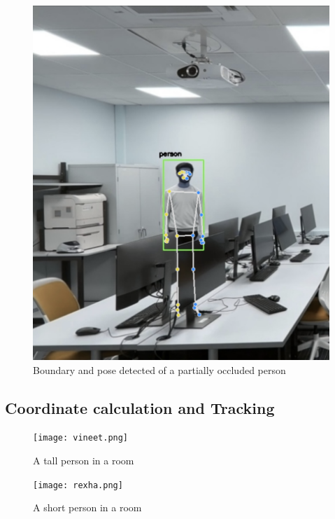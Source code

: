 \begin{figure}[H]
    \centering
    \includegraphics[width=1.0\textwidth]{1vp partial person pose.png}
    \caption{Boundary and pose detected of a partially occluded person}
    \label{fig: Boundary and pose detected of a partially occluded person}
\end{figure}

\subsection{Coordinate calculation and Tracking}

\begin{figure}[H]
    \centering
    \texttt{[image: vineet.png]}
    \caption{A tall person in a room}
    \label{fig: A tall person in a room}
\end{figure}

\begin{figure}[H]
    \centering
    \texttt{[image: rexha.png]}
    \caption{A short person in a room}
    \label{fig:A short person in a room}
\end{figure}

